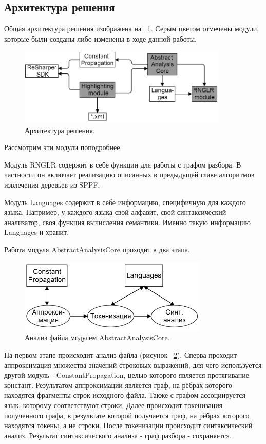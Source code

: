 \subsection{Архитектура решения}

Общая архитектура решения изображена на ~\ref{architecture}. Серым цветом отмечены модули, которые были созданы либо изменены в ходе данной работы.

\begin{figure}[h]
\centering
\includegraphics[width=100mm]{Pictures/architecture.png}
\caption{Архитектура решения.}
\label{architecture}
\end{figure}

Рассмотрим эти модули поподробнее. 

Модуль RNGLR содержит в себе функции для работы с графом разбора. В частности он включает реализацию описанных в предыдущей главе алгоритмов извлечения деревьев из SPPF. 

Модуль Languages содержит в себе информацию, специфичную для каждого языка. Например, у каждого языка свой алфавит, свой синтаксический анализатор, своя функция вычисления семантики. Именно такую информацию Languages и хранит. 

Работа модуля AbstractAnalysisCore проходит в два этапа. 

\begin{figure}[h]
\centering
\includegraphics[width=90mm]{Pictures/Core.png}
\caption{Анализ файла модулем AbstractAnalysisCore.}
\label{core}
\end{figure}

На первом этапе происходит анализ файла (рисунок ~\ref{core}). Сперва проходит аппроксимация множества значений строковых выражений, для чего используется другой модуль - ConstantPropagation, целью которого является протягивание констант. Результатом аппроксимации является граф, на рёбрах которого находятся фрагменты строк исходного файла. Также с графом ассоциируется язык, которому соответствуют строки. Далее происходит токенизация полученного графа, в результате которой получается граф, на рёбрах которого находятся токены, а не строки. После токенизации происходит синтаксический анализ. Результат синтаксического анализа - граф разбора - сохраняется. 

